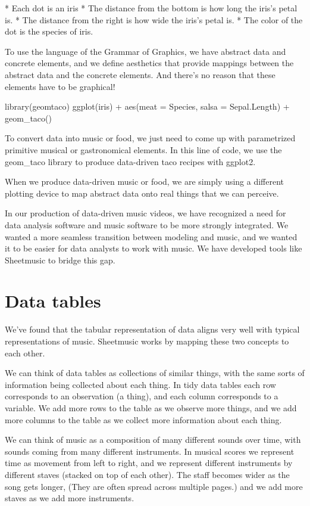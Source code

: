 \documentclass{acm_proc_article-sp}
\begin{document}
* Each dot is an iris
* The distance from the bottom is how long the iris's petal is.
* The distance from the right is how wide the iris's petal is.
* The color of the dot is the species of iris.

To use the language of the Grammar of Graphics, we have abstract data
and concrete elements, and we define aesthetics that provide mappings
between the abstract data and the concrete elements.
And there's no reason that these elements have to be graphical!

    library(geomtaco)
    ggplot(iris) + aes(meat = Species, salsa = Sepal.Length) + geom_taco()

To convert
data into music or food, we just need to come up with parametrized primitive
musical or gastronomical elements. In this line of code, we use the geom\_taco
library to produce data-driven taco recipes with ggplot2.

When we produce data-driven music or food,
we are simply using a different plotting device to map abstract data
onto real things that we can perceive.









In our production of data-driven music videos, we have recognized a need
for data analysis software and music software to be more strongly integrated.
We wanted a more seamless transition between modeling and music, and we
wanted it to be easier for data analysts to work with music. We have
developed tools like Sheetmusic to bridge this gap.

\section{Data tables}
We've found that the tabular representation of data aligns very well with
typical representations of music. Sheetmusic works by mapping these two
concepts to each other.

We can think of data tables as collections of similar things, with the
same sorts of information being collected about each thing. In tidy data
tables \cite{tidydata} each row corresponds to an observation (a thing),
and each column corresponds to a variable. We add more rows to the table
as we observe more things, and we add more columns to the table as we
collect more information about each thing.

We can think of music as a composition of many different sounds over time,
with sounds coming from many different instruments. In musical scores
we represent time as movement from left to right, and we represent different
instruments by different staves (stacked on top of each other).
The staff becomes wider as the song gets longer, (They are often spread
across multiple pages.) and we add more staves as we add more instruments.
\end{document}

